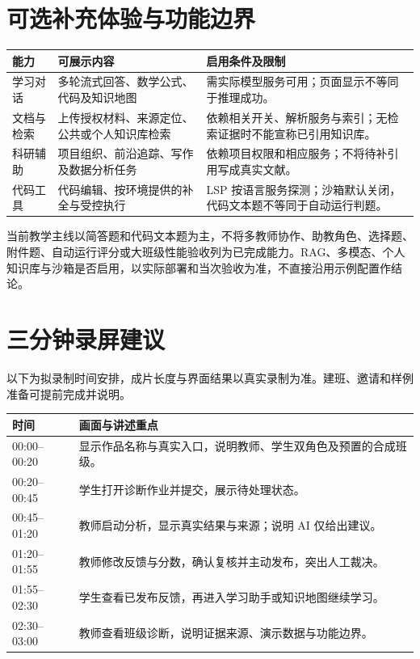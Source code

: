 \documentclass[UTF8,a4paper,zihao=-4,fontset=fandol]{ctexart}
\begin{document}
\section{可选补充体验与功能边界}
\noindent\begin{tabularx}{\textwidth}{@{}p{2.5cm}Xp{5.1cm}@{}}
\toprule
能力 & 可展示内容 & 启用条件及限制 \\
\midrule
学习对话 & 多轮流式回答、数学公式、代码及知识地图 & 需实际模型服务可用；页面显示不等同于推理成功。 \\
文档与检索 & 上传授权材料、来源定位、公共或个人知识库检索 & 依赖相关开关、解析服务与索引；无检索证据时不能宣称已引用知识库。 \\
科研辅助 & 项目组织、前沿追踪、写作及数据分析任务 & 依赖项目权限和相应服务；不将待补引用写成真实文献。 \\
代码工具 & 代码编辑、按环境提供的补全与受控执行 & LSP 按语言服务探测；沙箱默认关闭，代码文本题不等同于自动运行判题。 \\
\bottomrule
\end{tabularx}

当前教学主线以简答题和代码文本题为主，不将多教师协作、助教角色、选择题、附件题、自动运行评分或大班级性能验收列为已完成能力。RAG、多模态、个人知识库与沙箱是否启用，以实际部署和当次验收为准，不直接沿用示例配置作结论。

\section{三分钟录屏建议}
以下为拟录制时间安排，成片长度与界面结果以真实录制为准。建班、邀请和样例准备可提前完成并说明。

\noindent\begin{tabularx}{\textwidth}{@{}p{2.5cm}X@{}}
\toprule
时间 & 画面与讲述重点 \\
\midrule
00:00--00:20 & 显示作品名称与真实入口，说明教师、学生双角色及预置的合成班级。 \\
00:20--00:45 & 学生打开诊断作业并提交，展示待处理状态。 \\
00:45--01:20 & 教师启动分析，显示真实结果与来源；说明 AI 仅给出建议。 \\
01:20--01:55 & 教师修改反馈与分数，确认复核并主动发布，突出人工裁决。 \\
01:55--02:30 & 学生查看已发布反馈，再进入学习助手或知识地图继续学习。 \\
02:30--03:00 & 教师查看班级诊断，说明证据来源、演示数据与功能边界。 \\
\bottomrule
\end{tabularx}
\end{document}
